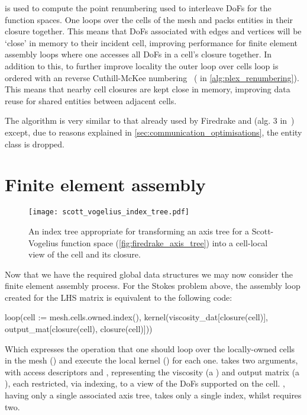 \documentclass[thesis]{subfiles}
\begin{document}
 is used to compute the point renumbering used to interleave DoFs for the function spaces.
One loops over the cells of the mesh and packs entities in their closure together.
This means that DoFs associated with edges and vertices will be `close' in memory to their incident cell, improving performance for finite element assembly loops where one accesses all DoFs in a cell's closure together.
In addition to this, to further improve locality the outer loop over cells loop is ordered with an reverse Cuthill-McKee numbering~\cite{cuthillReducingBandwidthSparse1969} ( in \cref{alg:plex_renumbering}).
This means that nearby cell closures are kept close in memory, improving data reuse for shared entities between adjacent cells.

The algorithm is very similar to that already used by Firedrake and  (alg. 3 in~\cite{langeEfficientMeshManagement2016}) except, due to reasons explained in \cref{sec:communication_optimisations}, the \ownediter entity class is dropped.

\section{Finite element assembly}

\begin{figure}
  \centering
  \texttt{[image: scott\_vogelius\_index\_tree.pdf]}
  \caption{
    An index tree appropriate for transforming an axis tree for a Scott-Vogelius function space (\cref{fig:firedrake_axis_tree}) into a cell-local view of the cell and its closure.
  }
  \label{fig:firedrake_index_tree}
\end{figure}

Now that we have the required global data structures we may now consider the finite element assembly process.
For the Stokes problem above, the assembly loop created for the LHS matrix is equivalent to the following  code:
\begin{pyinline}
  loop(cell := mesh.cells.owned.index(),
       kernel(viscosity_dat[closure(cell)],
              output_mat[closure(cell), closure(cell)]))
\end{pyinline}
Which expresses the operation that one should loop over the locally-owned cells in the mesh () and execute the local kernel () for each one.
 takes two arguments, with access descriptors  and , representing the viscosity (a ) and output matrix (a ), each restricted, via indexing, to a view of the DoFs supported on the cell.
, having only a single associated axis tree, takes only a single index, whilst  requires two.
\end{document}
